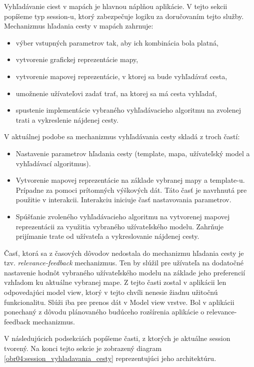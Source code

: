 Vyhľadávanie ciest v mapách je hlavnou náplňou aplikácie. V tejto sekcii popíšeme typ session-u, ktorý zabezpečuje logiku za doručovaním tejto služby. Mechanizmus hľadania cesty v mapách zahrnuje:
\begin{itemize}
    \item výber vstupných parametrov tak, aby ich kombinácia bola platná, 
    \item vytvorenie grafickej reprezentácie mapy,
    \item vytvorenie mapovej reprezentácie, v ktorej sa bude vyhľadávať cesta,   
    \item umožnenie užívateľovi zadať trať, na ktorej sa má cesta vyhľadať,
    \item spustenie implementácie vybraného vyhľadávacieho algoritmu na zvolenej trati a vykreslenie nájdenej cesty. 
\end{itemize} 
V aktuálnej podobe sa mechanizmus vyhľadávania cesty skladá z troch častí: 
\begin{itemize}
    \item Nastavenie parametrov hľadania cesty (template, mapa, užívateľský model a vyhľadávací algoritmus).
    \item Vytvorenie mapovej reprezentácie na základe vybranej mapy a template-u. Prípadne za pomoci prítomných výškových dát. Táto časť je navrhnutá pre použitie v interakcii. Interakciu iniciuje časť nastavovania parametrov. 
    \item Spúšťanie zvoleného vyhľadávacieho algoritmu na vytvorenej mapovej reprezentácii za využitia vybraného užívateľského modelu. Zahrňuje prijímanie trate od užívateľa a vykreslovanie nájdenej cesty.
\end{itemize} 

Časť, ktorá sa z časových dôvodov nedostala do mechanizmu hľadania cesty je tzv. \textit{relevance-feedback} mechanizmus. Ten by slúžil pre užívateľa na dodatočné nastavenie hodnôt vybraného užívateľského modelu na základe jeho preferencií vzhľadom ku aktuálne vybranej mape. Z tejto časti zostal v aplikácii len odpovedajúci model view, ktorý v tejto chvíli nenesie žiadnu užitočnú funkcionalitu. Slúži iba pre prenos dát v Model view vrstve. Bol v aplikácii ponechaný z dôvodu plánovaného budúceho rozšírenia aplikácie o relevance-feedback mechanizmus.

V následujúcich podsekciách popíšeme časti, z ktorých je aktuálne session tvorený. Na konci tejto sekcie je zobrazený diagram \ref{obr04:session_vyhladavania_cesty} reprezentujúci jeho architektúru.

